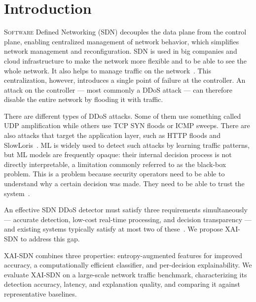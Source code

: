 \documentclass{ieeeaccess}
\begin{document}
\titlepgskip=-21pt

\maketitle

\section{Introduction}
\label{sec:intro}

S\textsc{oftware} Defined Networking (SDN) decouples the data plane from the control plane, enabling centralized management of network behavior, which simplifies network management and reconfiguration. SDN is used in big companies and cloud infrastructure to make the network more flexible and to be able to see the whole network. It also helps to manage traffic on the network~\cite{mckeown2008openflow,kreutz2015sdn}. This centralization, however, introduces a single point of failure at the controller. An attack on the controller --- most commonly a DDoS attack --- can therefore disable the entire network by flooding it with traffic.

There are different types of DDoS attacks. Some of them use something called UDP amplification while others use TCP SYN floods or ICMP sweeps. There are also attacks that target the application layer, such as HTTP floods and SlowLoris~\cite{mirkovic2004taxonomy,sharafaldin2019ddos,bhuyan2014network}. ML is widely used to detect such attacks by learning traffic patterns, but ML models are frequently opaque: their internal decision process is not directly interpretable, a limitation commonly referred to as the black-box problem. This is a problem because security operators need to be able to understand why a certain decision was made. They need to be able to trust the system~\cite{arrieta2020xai,guidotti2018survey,warnecke2020evaluating}.

An effective SDN DDoS detector must satisfy three requirements simultaneously --- accurate detection, low-cost real-time processing, and decision transparency --- and existing systems typically satisfy at most two of these~\cite{mousavi2015early}. We propose XAI-SDN to address this gap.

XAI-SDN combines three properties: entropy-augmented features for improved accuracy, a computationally efficient classifier, and per-decision explainability. We evaluate XAI-SDN on a large-scale network traffic benchmark, characterizing its detection accuracy, latency, and explanation quality, and comparing it against representative baselines.
\end{document}
